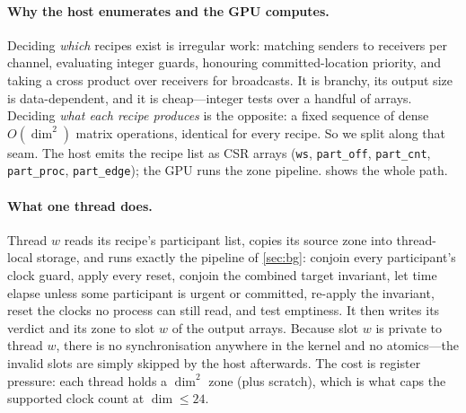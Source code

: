 \documentclass[11pt]{article}
\newcommand{\code}[1]{\texttt{\small #1}}
\begin{document}
\paragraph{Why the host enumerates and the GPU computes.} Deciding \emph{which} recipes exist is
irregular work: matching senders to receivers per channel, evaluating integer guards, honouring
committed-location priority, and taking a cross product over receivers for broadcasts. It is branchy,
its output size is data-dependent, and it is cheap---integer tests over a handful of arrays. Deciding
\emph{what each recipe produces} is the opposite: a fixed sequence of dense $O(\dim^2)$ matrix
operations, identical for every recipe. So we split along that seam. The host emits the recipe list as
CSR arrays (\code{ws}, \code{part\_off}, \code{part\_cnt}, \code{part\_proc}, \code{part\_edge}); the
GPU runs the zone pipeline.  shows the whole path.

\paragraph{What one thread does.} Thread $w$ reads its recipe's participant list, copies its source
zone into thread-local storage, and runs exactly the pipeline of \cref{sec:bg}: conjoin every
participant's clock guard, apply every reset, conjoin the combined target invariant, let time elapse
unless some participant is urgent or committed, re-apply the invariant, reset the clocks no process can
still read, and test emptiness. It then writes its verdict and its zone to slot $w$ of the output
arrays. Because slot $w$ is private to thread $w$, there is no synchronisation anywhere in the kernel
and no atomics---the invalid slots are simply skipped by the host afterwards. The cost is register
pressure: each thread holds a $\dim^2$ zone (plus scratch), which is what caps the supported clock
count at $\dim \le 24$.
\end{document}

